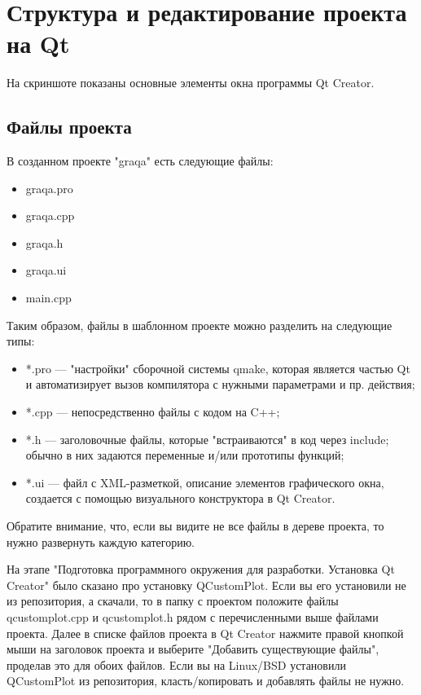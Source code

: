 \section{Структура и редактирование проекта на Qt}

На скриншоте показаны основные элементы окна программы Qt Creator.

\subsection{Файлы проекта}
В созданном проекте "graqa" есть следующие файлы:

\begin{itemize}
  \item graqa.pro
  \item graqa.cpp
  \item graqa.h
  \item graqa.ui
  \item main.cpp
\end{itemize}

Таким образом, файлы в шаблонном проекте можно разделить на следующие типы:

\begin{itemize}
  \item *.pro — "настройки" сборочной системы qmake, которая является частью Qt и автоматизирует вызов компилятора с нужными параметрами и пр. действия;
  \item *.cpp — непосредственно файлы с кодом на C++;
  \item *.h — заголовочные файлы, которые "встраиваются" в код через include; обычно в них задаются переменные и/или прототипы функций;
  \item *.ui — файл с XML-разметкой, описание элементов графического окна, создается с помощью визуального конструктора в Qt Creator.
\end{itemize}

Обратите внимание, что, если вы видите не все файлы в дереве проекта, то нужно развернуть каждую категорию.

На этапе "Подготовка программного окружения для разработки. Установка Qt Creator" было сказано про установку QCustomPlot. Если вы его установили не из репозитория, а скачали, то в папку с проектом положите файлы qcustomplot.cpp и qcustomplot.h рядом с перечисленными выше файлами проекта. Далее в списке файлов проекта в Qt Creator нажмите правой кнопкой мыши на заголовок проекта и выберите "Добавить существующие файлы", проделав это для обоих файлов. Если вы на Linux/BSD установили QCustomPlot из репозитория, класть/копировать и добавлять файлы не нужно.

